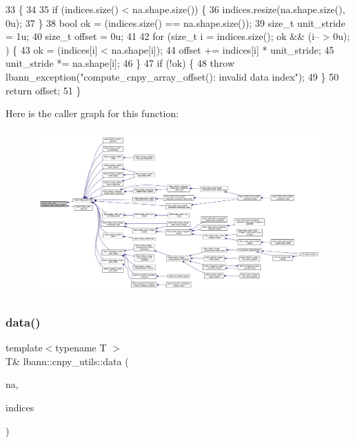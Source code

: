 \begin{DoxyCode}
33                                                      \{
34 
35   \textcolor{keywordflow}{if} (indices.size() < na.shape.size()) \{
36     indices.resize(na.shape.size(), 0u);
37   \}
38   \textcolor{keywordtype}{bool} ok = (indices.size() == na.shape.size());
39   \textcolor{keywordtype}{size\_t} unit\_stride = 1u;
40   \textcolor{keywordtype}{size\_t} offset = 0u;
41 
42   \textcolor{keywordflow}{for} (\textcolor{keywordtype}{size\_t} i = indices.size(); ok && (i-- > 0u); ) \{
43     ok = (indices[i] < na.shape[i]);
44     offset += indices[i] * unit\_stride;
45     unit\_stride *= na.shape[i];
46   \}
47   \textcolor{keywordflow}{if} (!ok) \{
48     \textcolor{keywordflow}{throw} lbann\_exception(\textcolor{stringliteral}{"compute\_cnpy\_array\_offset(): invalid data index"});
49   \}
50   \textcolor{keywordflow}{return} offset;
51 \}
\end{DoxyCode}
Here is the caller graph for this function\+:\nopagebreak
\begin{figure}[H]
\begin{center}
\leavevmode
\includegraphics[width=350pt]{namespacelbann_1_1cnpy__utils_a39fd207d94d1333e6379c53423b6f1a1_icgraph}
\end{center}
\end{figure}
\mbox{\label{namespacelbann_1_1cnpy__utils_a9ac86d96ccb1f8b4b2ea16441738781f}} 
\subsubsection{\texorpdfstring{data()}{data()}}
{\footnotesize\ttfamily template$<$typename T $>$ \\
T\& lbann\+::cnpy\+\_\+utils\+::data (\begin{DoxyParamCaption}\item[{const cnpy\+::\+Npy\+Array \&}]{na,  }\item[{const std\+::vector$<$ size\+\_\+t $>$}]{indices }\end{DoxyParamCaption})\hspace{0.3cm}{\ttfamily [inline]}}

